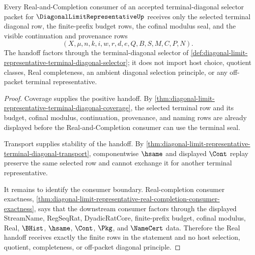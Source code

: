 \begin{theorem}
\label{thm:diagonal-limit-representative-terminal-diagonal-real-handoff}
Every Real-and-Completion consumer of an accepted terminal-diagonal selector packet for $\DiagonalLimitRepresentativeUp$ receives only the selected terminal diagonal row, the finite-prefix budget rows, the cofinal modulus seal, and the visible continuation and provenance rows
$$
(X,\mu,n,k,i,w,r,d,e,Q,B,S,M,C,P,N).
$$
The handoff factors through the terminal-diagonal selector of \autoref{def:diagonal-limit-representative-terminal-diagonal-selector}; it does not import host choice, quotient classes, Real completeness, an ambient diagonal selection principle, or any off-packet terminal representative.
\end{theorem}
\begin{proof}
Coverage supplies the positive handoff. By \autoref{thm:diagonal-limit-representative-terminal-diagonal-coverage}, the selected terminal row and its budget, cofinal modulus, continuation, provenance, and naming rows are already displayed before the Real-and-Completion consumer can use the terminal seal.

Transport supplies stability of the handoff. By \autoref{thm:diagonal-limit-representative-terminal-diagonal-transport}, componentwise $\hsame$ and displayed $\Cont$ replay preserve the same selected row and cannot exchange it for another terminal representative.

It remains to identify the consumer boundary. Real-completion consumer exactness, \autoref{thm:diagonal-limit-representative-real-completion-consumer-exactness}, says that the downstream consumer factors through the displayed StreamName, RegSeqRat, DyadicRatCore, finite-prefix budget, cofinal modulus, Real, $\BHist$, $\hsame$, $\Cont$, $\Pkg$, and $\NameCert$ data. Therefore the Real handoff receives exactly the finite rows in the statement and no host selection, quotient, completeness, or off-packet diagonal principle.
\end{proof}
